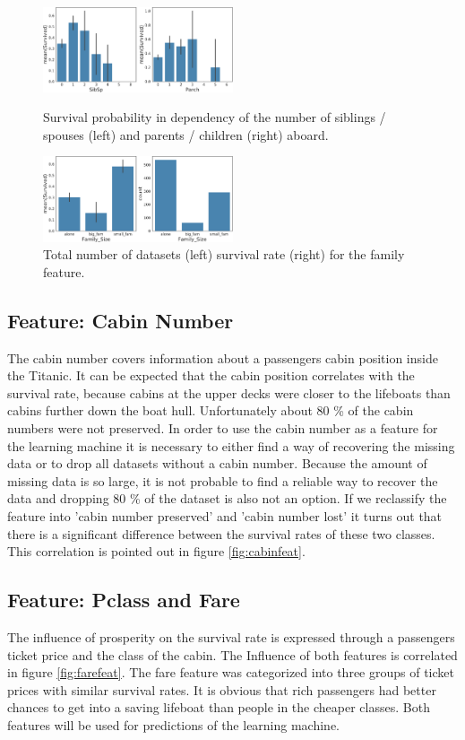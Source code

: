    \begin{figure}
 \centering
     \includegraphics[width=0.5\textwidth]{media_saved/family_size_before}
     \caption{Survival probability in dependency of the number of siblings / spouses (left) and parents / children (right) aboard.}
     \label{fig:familyold}
     \includegraphics[width=0.5\textwidth]{media_saved/family_size_after}
     \caption{Total number of datasets (left) survival rate (right) for the family feature.}
     \label{fig:familynew}
 \end{figure}
 
\subsection{Feature: Cabin Number}
The cabin number covers information about a passengers cabin position inside the Titanic. It can be expected that the cabin position correlates with the survival rate, because cabins at the upper decks were closer to the lifeboats than cabins further down the boat hull. Unfortunately about 80 \% of the cabin numbers were not preserved. In order to use the cabin number as a feature for the learning machine it is necessary to either find a way of recovering the missing data or to drop all datasets without a cabin number. Because the amount of missing data is so large, it is not probable to find a reliable way to recover the data and dropping 80 \% of the dataset is also not an option. If we reclassify the feature into 'cabin number preserved' and 'cabin number lost' it turns out that there is a significant difference between the survival rates of these two classes. This correlation is pointed out in figure \ref{fig:cabinfeat}.

\subsection{Feature: Pclass and Fare}
The influence of prosperity on the survival rate is expressed through a passengers ticket price and the class of the cabin. The Influence of both features is correlated in figure \ref{fig:farefeat}. The fare feature was categorized into three groups of ticket prices with similar survival rates. It is obvious that rich passengers had better chances to get into a saving lifeboat than people in the cheaper classes. Both features will be used for predictions of the learning machine.

